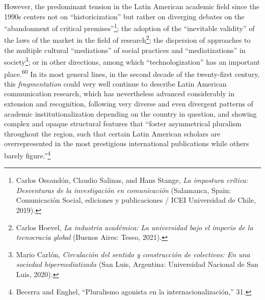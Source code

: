 \documentclass{tufte-handout}
\begin{document}
However, the predominant tension in the Latin American academic field
since the 1990s centers not on ``historicization'' but rather on
diverging debates on the ``abandonment of critical
premises''\footnote{Carlos Ossandón, Claudio Salinas, and Hans Stange,
  \emph{La impostura crítica: Desventuras de la investigación en
  comunicación} (Salamanca, Spain: Comunicación Social, ediciones y
  publicaciones / ICEI Universidad de Chile, 2019).}; the adoption of
the ``inevitable validity'' of the laws of the market in the field of
research\footnote{Carlos Hoevel, \emph{La industria académica: La
  universidad bajo el imperio de la tecnocracia global} (Buenos Aires:
  Teseo, 2021).}; the dispersion of approaches to the multiple cultural
``mediations'' of social practices and ``mediatizations'' in
society\footnote{Mario Carlón, \emph{Circulación del sentido y
  construcción de colectivos: En una sociedad hipermediatizada} (San
  Luis, Argentina: Universidad Nacional de San Luis, 2020).}; or in
other directions, among which ``technologization'' has an important
place.\textsuperscript{60} In its most general lines, in the
second decade of the twenty-first century, this \emph{fragmentation}
could very well continue to describe Latin American communication
research, which has nevertheless advanced considerably in extension and
recognition, following very diverse and even divergent patterns of
academic institutionalization depending on the country in question, and
showing complex and opaque structural features that ``foster
asymmetrical pluralism throughout the region, such that certain Latin
American scholars are overrepresented in the most prestigious
international publications while others barely figure.''\footnote{Becerra
  and Enghel, ``Pluralismo agonista en la internacionalización,'' 31.}
\end{document}
